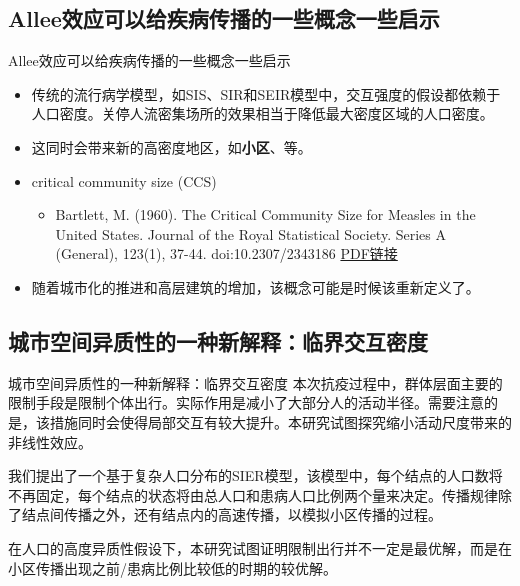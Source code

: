 \subsection{Allee效应可以给疾病传播的一些概念一些启示}
\begin{frame}{Allee效应可以给疾病传播的一些概念一些启示}
    \begin{itemize}
        \item 传统的流行病学模型，如SIS、SIR和SEIR模型中，交互强度的假设都依赖于人口密度。关停人流密集场所的效果相当于降低最大密度区域的人口密度。
        \item 这同时会带来新的高密度地区，如\textbf{小区}、等。
        \pause
        \item critical community size (CCS)
        \begin{itemize}
            \item Bartlett, M. (1960). The Critical Community Size for Measles in the United States. Journal of the Royal Statistical Society. Series A (General), 123(1), 37-44. doi:10.2307/2343186 \href{https://www.jstor.org/stable/pdf/2343186.pdf?refreqid=excelsior\%3A8b718b75a5e4633091a524237af85adf}{PDF链接}
        \end{itemize}
        \item 随着城市化的推进和高层建筑的增加，该概念可能是时候该重新定义了。
    \end{itemize}
\end{frame}

\subsection{城市空间异质性的一种新解释：临界交互密度}

\begin{frame}{城市空间异质性的一种新解释：临界交互密度}
    本次抗疫过程中，群体层面主要的限制手段是限制个体出行。实际作用是减小了大部分人的活动半径。需要注意的是，该措施同时会使得局部交互有较大提升。本研究试图探究缩小活动尺度带来的非线性效应。
    
    \vspace{0.5cm}
    
    我们提出了一个基于复杂人口分布的SIER模型，该模型中，每个结点的人口数将不再固定，每个结点的状态将由总人口和患病人口比例两个量来决定。传播规律除了结点间传播之外，还有结点内的高速传播，以模拟小区传播的过程。
    
    \vspace{0.5cm}
    
    在人口的高度异质性假设下，本研究试图证明限制出行并不一定是最优解，而是在小区传播出现之前/患病比例比较低的时期的较优解。%
\end{frame}

